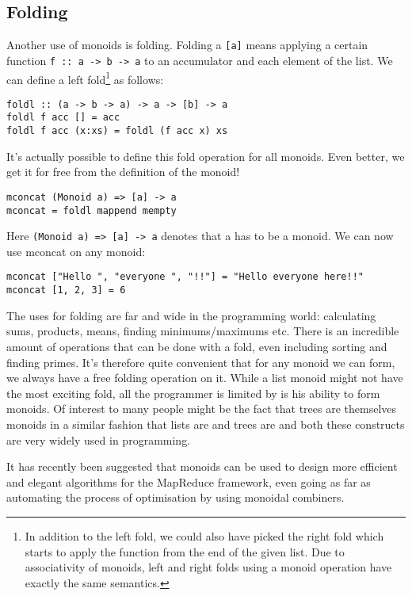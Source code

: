 \documentclass{acm_proc_article-sp}
\begin{document}
\subsection{Folding}
Another use of monoids is folding. Folding a \texttt{[a]} means applying a
certain function \texttt{f :: a -> b -> a} to an accumulator and each element
of the list. We can define a left fold\footnote{In addition to the
  left fold, we could also have picked the right fold which starts to
  apply the function from the end of the given list. Due to
  associativity of monoids, left and right folds using a monoid
  operation have exactly the same semantics.} as follows:
\begin{lstlisting}
foldl :: (a -> b -> a) -> a -> [b] -> a
foldl f acc [] = acc
foldl f acc (x:xs) = foldl (f acc x) xs
\end{lstlisting}
It's actually possible to define this fold operation for all
monoids. Even better, we get it for free from the definition of the
monoid!
\begin{lstlisting}
mconcat (Monoid a) => [a] -> a
mconcat = foldl mappend mempty
\end{lstlisting}
Here
\texttt{(Monoid a) => [a] -> a} denotes that a has to be a
monoid. We can now use mconcat on any monoid:
\begin{lstlisting}
mconcat ["Hello ", "everyone ", "!!"] = "Hello everyone here!!"
mconcat [1, 2, 3] = 6
\end{lstlisting}
The uses for folding are far and wide in the programming world:
calculating sums, products, means, finding minimums/maximums etc. There is an
incredible amount of operations that can be done with a fold, even
including sorting and finding primes\cite{haskell:fold}. It's
therefore quite convenient that for any monoid we can form, we always
have a free folding operation on it. While a list monoid might not
have the most exciting fold, all the programmer is limited by is his
ability to form monoids. Of interest to many people might be the fact
that trees are themselves monoids in a similar fashion that lists are
and trees are and both these constructs are very widely used in programming.

It has recently been suggested that monoids can be used to design more
efficient and elegant algorithms for the MapReduce framework, even
going as far as automating the process of optimisation by using
monoidal combiners.\cite{Lin:monodify}
\end{document}
